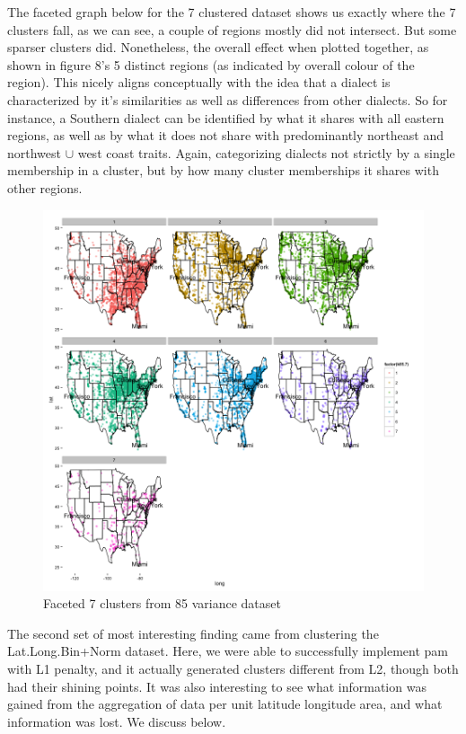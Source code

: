 \documentclass{article}\usepackage[]{graphicx}\usepackage[]{color}
\begin{document}
The faceted graph below for the 7 clustered dataset shows us exactly where the 7 clusters fall, as we can see, a couple of regions mostly did not intersect.  But some sparser clusters did.  Nonetheless, the overall effect when plotted together, as shown in figure 8's 5 distinct regions (as indicated by overall colour of the region).  This nicely aligns conceptually with the idea that a dialect is characterized by it's similarities as well as differences from other dialects.  So for instance, a Southern dialect can be identified by what it shares with all eastern regions, as well as by what it does not share with predominantly northeast and northwest $\cup$ west coast traits.  Again, categorizing dialects not strictly by a single membership in a cluster, but by how many cluster memberships it shares with other regions. \\
\begin{figure}[H]

\includegraphics[width=550pt, height=380pts]{Rplot01.png}
\caption{Faceted 7 clusters from 85 variance dataset}

\end{figure}

The second set of most interesting finding came from clustering the Lat.Long.Bin+Norm dataset.   Here, we were able to successfully implement pam with L1 penalty, and it actually generated clusters different from L2, though both had their shining points.  It was also interesting to see what information was gained from the aggregation of data per unit latitude longitude area, and what information was lost.  We discuss below. 
\end{document}
